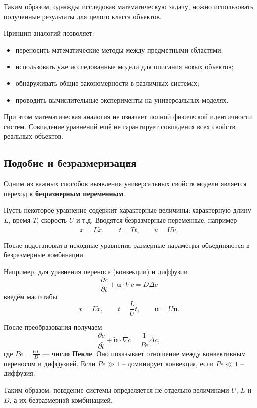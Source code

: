 Таким образом, однажды исследовав математическую задачу, можно использовать полученные результаты для целого класса объектов.

Принцип аналогий позволяет:
\begin{itemize}
	\item переносить математические методы между предметными областями;
	\item использовать уже исследованные модели для описания новых объектов;
	\item обнаруживать общие закономерности в различных системах;
	\item проводить вычислительные эксперименты на универсальных моделях.
\end{itemize}

При этом математическая аналогия не означает полной физической идентичности систем. Совпадение уравнений ещё не гарантирует совпадения всех свойств реальных объектов.

\subsection{Подобие и безразмеризация}

Одним из важных способов выявления универсальных свойств модели является переход к \textbf{безразмерным переменным}.

Пусть некоторое уравнение содержит характерные величины: характерную длину $L$, время $T$, скорость $U$ и т.д. Вводятся безразмерные переменные, например
\[
x = L\widetilde{x},
\qquad
t = T\widetilde{t},
\qquad
u = U\widetilde{u}.
\]

После подстановки в исходные уравнения размерные параметры объединяются в безразмерные комбинации.

Например, для уравнения переноса (конвекции) и диффузии
\[
\frac{\partial c}{\partial t}
+
\mathbf u\cdot\nabla c
=
D\Delta c
\]
введём масштабы
\[
x=L\widetilde{x},
\qquad
t=\frac{L}{U}\widetilde{t},
\qquad
\mathbf u=U\widetilde{\mathbf u}.
\]

После преобразования получаем
\[
\frac{\partial c}{\partial \widetilde t}
+
\widetilde{\mathbf u}\cdot
\widetilde{\nabla}c
=
\frac{1}{Pe}\widetilde{\Delta}c,
\]
где $Pe=\frac{UL}{D}$ --- \textbf{число Пекле}. Оно показывает отношение между конвективным переносом и диффузией. Если $Pe \gg 1$ -- доминирует конвекция, если $Pe \ll 1$ -- диффузия.

Таким образом, поведение системы определяется не отдельно величинами $U$, $L$ и $D$, а их безразмерной комбинацией.


